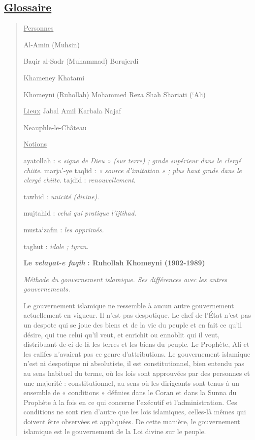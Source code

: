 \hypertarget{glossaire-6}{%
\subsection{\texorpdfstring{\underline{Glossaire}}{Glossaire}}\label{glossaire-6}}

\begin{quote}
\underline{Personnes}

Al-Amin (Muhsin)

Baqir al-Sadr (Muhammad) Borujerdi

Khameney Khatami

Khomeyni (Ruhollah) Mohammed Reza Shah Shariati (`Ali)

\underline{Lieux} Jabal Amil Karbala Najaf

Neauphle-le-Château

\underline{Notions}

ayatollah : « \emph{signe de Dieu » (sur terre) ; grade supérieur dans
le clergé chiite}. marja'-ye taqlid : \emph{« source d'imitation » ;
plus haut grade dans le clergé chiite.} tajdid : \emph{renouvellement}.

tawhid : \emph{unicité (divine).}

mujtahid : \emph{celui qui pratique l'ijtihad.}

musta`zafin : \emph{les opprimés.}

taghut : \emph{idole ; tyran}.

\textbf{Le \emph{velayat-e faqih} : Ruhollah Khomeyni (1902-1989)}

\emph{Méthode du gouvernement islamique. Ses différences avec les autres
gouvernements.}

Le gouvernement islamique ne ressemble à aucun autre gouvernement
actuellement en vigueur. Il n'est pas despotique. Le chef de l'État
n'est pas un despote qui se joue des biens et de la vie du peuple et en
fait ce qu'il désire, qui tue celui qu'il veut, et enrichit ou ennoblit
qui il veut, distribuant de-ci de-là les terres et les biens du peuple.
Le Prophète, Ali et les califes n'avaient pas ce genre d'attributions.
Le gouvernement islamique n'est ni despotique ni absolutiste, il est
constitutionnel, bien entendu pas au sens habituel du terme, où les lois
sont approuvées par des personnes et une majorité : constitutionnel, au
sens où les dirigeants sont tenus à un ensemble de « conditions »
définies dans le Coran et dans la Sunna du Prophète à la fois en ce qui
concerne l'exécutif et l'administration. Ces conditions ne sont rien
d'autre que les lois islamiques, celles-là mêmes qui doivent être
observées et appliquées. De cette manière, le gouvernement islamique est
le gouvernement de la Loi divine sur le peuple.


\end{quote}
